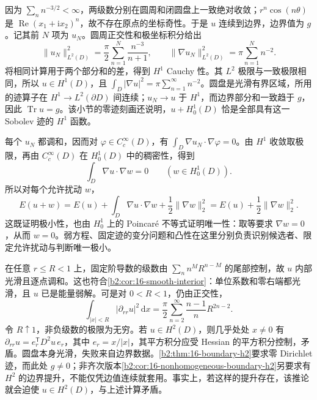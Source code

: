 \begin{solution}
因为 \(\sum_n n^{-3/2}<\infty\)，两级数分别在圆周和闭圆盘上一致绝对收敛；\(r^n\cos(n\theta)\) 是 \(\operatorname{Re}(x_1+\mathrm ix_2)^n\)，故不存在原点的坐标奇性。于是 \(u\) 连续到边界，边界值为 \(g\)。记其前 \(N\) 项为 \(u_N\)。圆周正交性和极坐标积分给出
\[
 \|u_N\|_{L^2(D)}^2
 =\frac\pi2\sum_{n=1}^N\frac{n^{-3}}{n+1},\qquad
 \|\nabla u_N\|_{L^2(D)}^2
 =\pi\sum_{n=1}^N n^{-2}.
\]
将相同计算用于两个部分和的差，得到 \(H^1\) Cauchy 性。其 \(L^2\) 极限与一致极限相同，所以 \(u\in H^1(D)\)，且
\(\int_D|\nabla u|^2=\pi\sum_{n=1}^\infty n^{-2}\)。圆盘是光滑有界区域，所用的迹算子在 \(H^1\to L^2(\partial D)\) 间连续；\(u_N\to u\) 于 \(H^1\)，而边界部分和一致趋于 \(g\)，因此 \(\operatorname{Tr}u=g\)。该小节的零迹刻画还说明，\(u+H_0^1(D)\) 恰是全部具有这一 Sobolev 迹的 \(H^1\) 函数。

每个 \(u_N\) 都调和，因而对 \(\varphi\in C_c^\infty(D)\)，有 \(\int_D\nabla u_N\cdot\nabla\varphi=0\)。由 \(H^1\) 收敛取极限，再由 \(C_c^\infty(D)\) 在 \(H_0^1(D)\) 中的稠密性，得到
\[
 \int_D\nabla u\cdot\nabla w=0\qquad(w\in H_0^1(D)).
\]
所以对每个允许扰动 \(w\)，
\[
 E(u+w)=E(u)+\int_D\nabla u\cdot\nabla w
                 +\frac12\|\nabla w\|_2^2
 =E(u)+\frac12\|\nabla w\|_2^2.
\]
这既证明极小性，也由 \(H_0^1\) 上的 Poincaré 不等式证明唯一性：取等要求 \(\nabla w=0\)，从而 \(w=0\)。弱方程、固定迹的变分问题和凸性在这里分别负责识别候选者、限定允许扰动与判断唯一极小。

在任意 \(r\leq R<1\) 上，固定阶导数的级数由 \(\sum_n n^M R^{n-M}\) 的尾部控制，故 \(u\) 内部光滑且逐点调和。这也符合\cref{b2:cor:16-smooth-interior}：单位系数和零右端都光滑，且 \(u\) 已是能量弱解。可是对 \(0<R<1\)，仍由正交性，
\[
 \int_{|x|<R}|\partial_{rr}u|^2\,\mathrm dx
 =\frac\pi2\sum_{n=2}^\infty\frac{n-1}{n}R^{2n-2}.
\]
令 \(R\uparrow1\)，非负级数的极限为无穷。若 \(u\in H^2(D)\)，则几乎处处 \(x\ne0\) 有 \(\partial_{rr}u=e_r^{\mathsf T}D^2u\,e_r\)，其中 \(e_r=x/|x|\)，其平方积分应受 Hessian 的平方积分控制，矛盾。圆盘本身光滑，失败来自边界数据。\cref{b2:thm:16-boundary-h2}要求零 Dirichlet 迹，而此处 \(g\ne0\)；非齐次版本\cref{b2:cor:16-nonhomogeneous-boundary-h2}另要求有 \(H^2\) 的边界提升，不能仅凭边值连续就套用。事实上，若这样的提升存在，该推论就会迫使 \(u\in H^2(D)\)，与上述计算矛盾。
\end{solution}

